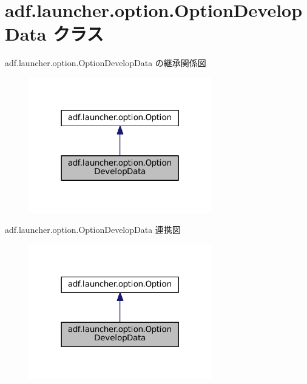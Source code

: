 \hypertarget{classadf_1_1launcher_1_1option_1_1OptionDevelopData}{}\section{adf.\+launcher.\+option.\+Option\+Develop\+Data クラス}
\label{classadf_1_1launcher_1_1option_1_1OptionDevelopData}


adf.\+launcher.\+option.\+Option\+Develop\+Data の継承関係図
\nopagebreak
\begin{figure}[H]
\begin{center}
\leavevmode
\includegraphics[width=225pt]{classadf_1_1launcher_1_1option_1_1OptionDevelopData__inherit__graph}
\end{center}
\end{figure}


adf.\+launcher.\+option.\+Option\+Develop\+Data 連携図
\nopagebreak
\begin{figure}[H]
\begin{center}
\leavevmode
\includegraphics[width=225pt]{classadf_1_1launcher_1_1option_1_1OptionDevelopData__coll__graph}
\end{center}
\end{figure}
